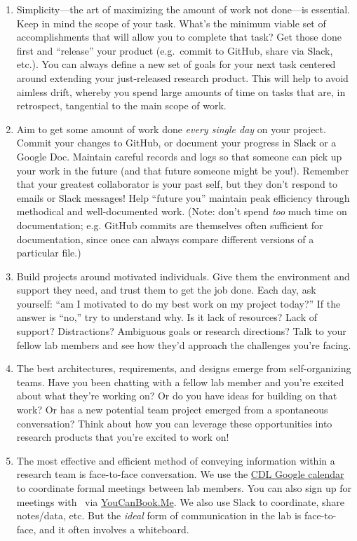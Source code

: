 \documentclass{tufte-book} %
\begin{document}
\begin{enumerate}
\item Simplicity---the art of maximizing the amount of work not
  done---is essential.  Keep in mind the scope of your task.  What's
  the minimum viable set of accomplishments that will allow you to
  complete that task?  Get those done first and ``release'' your product
  (e.g.\ commit to GitHub, share via Slack, etc.).  You can always
  define a new set of goals for your next task centered around
  extending your just-released research product.  This will help to
  avoid aimless drift, whereby you spend large amounts of time on
  tasks that are, in retrospect, tangential to the main scope of work.

\item Aim to get some amount of work done \textit{every single day} on
  your project.  Commit your changes to GitHub, or document your
  progress in Slack or a Google Doc.  Maintain careful records and
  logs so that someone can pick up your work in the future (and that
  future someone might be you!).  Remember that your greatest
  collaborator is your past self, but they don't respond to emails
  or Slack messages!  Help ``future you'' maintain peak efficiency
  through methodical and well-documented work.  (Note: don't spend
  \textit{too} much time on documentation; e.g. GitHub commits are
  themselves often sufficient for documentation, since once can always
  compare different versions of a particular file.)

\item Build projects around motivated individuals.  Give them the
  environment and support they need, and trust them to get the job
  done.  Each day, ask yourself: ``am I motivated to do my best work
  on my project today?''  If the answer is ``no,'' try to understand
  why.  Is it lack of resources?  Lack of support?  Distractions?
  Ambiguous goals or research directions?  Talk to your fellow lab
  members and see how they'd approach the challenges you're facing.

\item The best architectures, requirements, and designs emerge from
  self-organizing teams.  Have you been chatting with a fellow lab
  member and you're excited about what they're working on?  Or do you
  have ideas for building on that work?  Or has a new potential team
  project emerged from a spontaneous conversation?  Think about how
  you can leverage these opportunities into research products that
  you're excited to work on!

\item The most effective and efficient method of conveying information
  within a research team is face-to-face conversation.  We use the
  \hyperref[sec: scheduling]{CDL Google calendar} to coordinate formal
  meetings between lab members.  You can also sign up for meetings
  with \director~via
  \href{https://context-lab.youcanbook.me/}{YouCanBook.Me}.  We also
  use Slack to coordinate, share notes/data, etc.  But the
  \textit{ideal} form of communication in the lab is face-to-face, and
  it often involves a whiteboard.


\end{enumerate}
\end{document}
